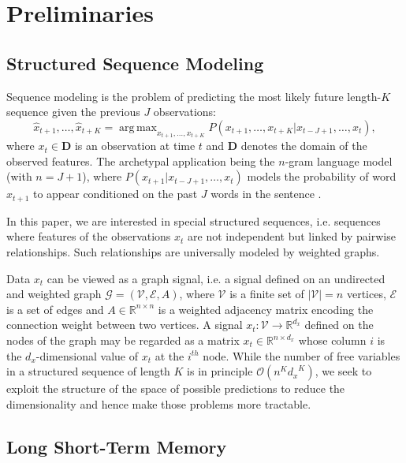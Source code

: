 \documentclass{article} %
\DeclareMathOperator*{\argmax}{arg\,max}
\newcommand{\R}{\mathbb{R}}
\newcommand{\bO}{\mathcal{O}}
\newcommand{\G}{\mathcal{G}}
\newcommand{\V}{\mathcal{V}}
\newcommand{\E}{\mathcal{E}}
\begin{document}
\section{Preliminaries}


\subsection{Structured Sequence Modeling}

Sequence modeling is the problem of predicting the most likely future
length-$K$ sequence given the previous $J$ observations:
\begin{equation} \label{eqn:seq}
	\hat{x}_{t+1}, \ldots, \hat{x}_{t+K} =
	\argmax_{x_{t+1}, \ldots, x_{t+K}}
	P(x_{t+1}, \ldots, x_{t+K} | x_{t-J+1}, \ldots, x_t),
\end{equation}
where $x_t \in \mathbf{D}$ is an observation at time $t$ and $\mathbf{D}$
denotes the domain of the observed features. The archetypal application being
the $n$-gram language model (with $n = J+1$), where $P(x_{t+1} | x_{t-J+1},
\ldots, x_t)$ models the probability of word $x_{t+1}$ to appear conditioned on
the past $J$ words in the sentence \citep{seq_graves}.

In this paper, we are interested in special structured sequences, i.e. sequences where features of the observations $x_t$ are not independent but linked by pairwise relationships. Such relationships are universally modeled by weighted graphs. 

Data $x_t$ can be viewed as a graph signal, i.e.
a signal defined on an undirected and weighted graph $\G = (\V, \E, A)$, where
$\V$ is a finite set of $|\V| = n$ vertices, $\E$ is a set of edges and $A \in
\R^{n \times n}$ is a weighted adjacency matrix encoding the connection weight
between two vertices. A signal $x_t: \V \rightarrow \R^{d_x}$ defined on the
nodes of the graph may be regarded as a matrix $x_t \in \R^{n \times d_x}$
whose column $i$ is the $d_x$-dimensional value of $x_t$ at the $i^{th}$ node.
While the number of free variables in a structured sequence of length $K$ is in
principle $\bO(n^K {d_x}^K)$, we seek to exploit the structure of the space
of possible predictions to reduce the dimensionality and hence make those
problems more tractable.

\subsection{Long Short-Term Memory}
\end{document}

